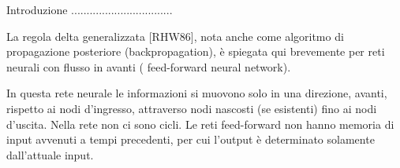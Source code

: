


Introduzione .................................

La regola delta generalizzata [RHW86], nota anche come algoritmo di propagazione posteriore (backpropagation), è spiegata qui brevemente per reti neurali con flusso in avanti ( feed-forward neural network).

In questa rete neurale le informazioni si muovono solo in una direzione, avanti, rispetto ai nodi d'ingresso, attraverso nodi nascosti (se esistenti) fino ai nodi d'uscita. Nella rete non ci sono cicli. Le reti feed-forward non hanno memoria di input avvenuti a tempi precedenti, per cui l'output è determinato solamente dall'attuale input.

